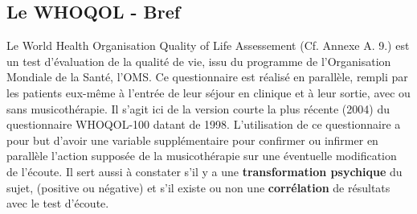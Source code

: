 \subsection* {Le WHOQOL  - Bref}  
Le World Health 	Organisation Quality of Life Assessement  (Cf. Annexe A. 9.) 
est un test d'évaluation de la qualité de vie, issu du
programme de l'Organisation Mondiale de la Santé, l'OMS.
Ce questionnaire est réalisé en parallèle, rempli par
les patients eux-même à l'entrée de leur séjour en clinique et
à leur sortie, avec ou sans musicothérapie.
Il s'agit ici de la version courte  la plus récente (2004) du questionnaire
WHOQOL-100 datant de 1998.
L'utilisation de ce questionnaire a pour but d'avoir
une variable supplémentaire pour confirmer ou infirmer en
parallèle l'action supposée  de la musicothérapie sur une éventuelle
modification de l'écoute.
Il sert aussi à constater s'il y a une\textbf{ transformation psychique }du sujet,
(positive ou négative) et s'il existe ou non une \textbf{corrélation }de
résultats avec le test d'écoute.

